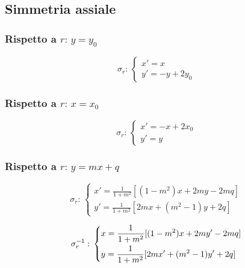 \subsection{Simmetria assiale}
\begin{center}
\end{center}

\subsubsection{Rispetto a $r:\,y=y_0$}
\begin{equation*}
\sigma_r:\,\begin{cases}
x'= x\\
y'= -y+2y_0
\end{cases}
\end{equation*}

\subsubsection{Rispetto a $r:\,x=x_0$}
\begin{equation*}
\sigma_r:\,\begin{cases}
x'= -x+2x_0\\
y'=y
\end{cases}
\end{equation*}

\subsubsection{Rispetto a $r:\,y=mx+q$}
\begin{equation*}
\sigma_r:\,\begin{cases}
x'=\frac{1}{1+m^2}[(1-m^2)x+2my-2mq]\\
y'=\frac{1}{1+m^2}[2mx+(m^2-1)y+2q]
\end{cases}
\end{equation*}

\begin{equation*}
\sigma_r^{-1}:\,\begin{dcases}
x=\frac{1}{1+m^2}[(1-m^2)x +2my'-2mq]\\
y=\frac{1}{1+m^2}[2mx'+(m^2-1)y'+2q]
\end{dcases}
\end{equation*}

